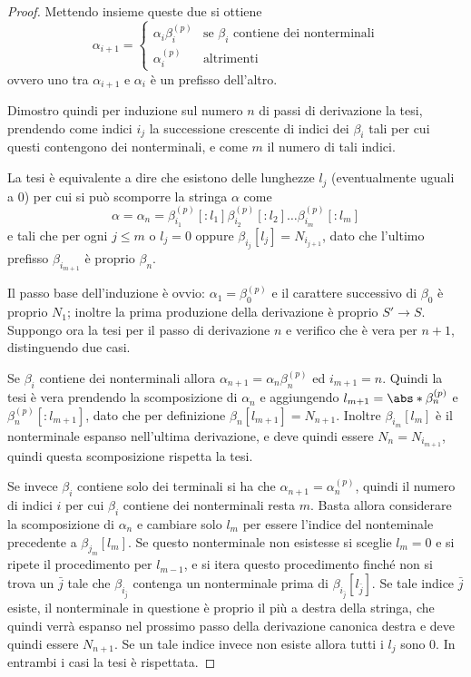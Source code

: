 \documentclass[12pt]{article}
\numberwithin{theorem}{subsection}
\begin{document}
\begin{proof}
	Mettendo insieme queste due si ottiene
	\[
	\alpha_{i+1} = \begin{cases*}
	\alpha_i \beta_i^{(p)} & \text{se $\beta_i$ contiene dei nonterminali} \\
	\alpha_i^{(p)} & \text{altrimenti}
	\end{cases*}
	\]
	ovvero uno tra $\alpha_{i+1}$ e $\alpha_i$ è un prefisso dell'altro.
	
	Dimostro quindi per induzione sul numero $n$ di passi di derivazione la tesi, prendendo come indici $i_j$ la successione crescente di indici dei $\beta_i$ tali per cui questi contengono dei nonterminali, e come $m$ il numero di tali indici.
	
	La tesi è equivalente a dire che esistono delle lunghezze $l_j$ (eventualmente uguali a 0) per cui si può scomporre la stringa $\alpha$ come
	\[
	\alpha = \alpha_n = \beta_{i_1}^{(p)}[:l_1] \beta_{i_2}^{(p)}[:l_2] \dots \beta_{i_m}^{(p)}[:l_m]
	\]
	e tali che per ogni $j \le m$ o $l_j = 0$ oppure $\beta_{i_j}[l_j] = N_{i_{j + 1}}$, dato che l'ultimo prefisso $\beta_{i_{m+1}}$ è proprio $\beta_n$.
	
	Il passo base dell'induzione è ovvio: $\alpha_1 = \beta_0^{(p)}$ e il carattere successivo di $\beta_0$ è proprio $N_1$; inoltre la prima produzione della derivazione è proprio $S' \rightarrow S$. Suppongo ora la tesi per il passo di derivazione $n$ e verifico che è vera per $n + 1$, distinguendo due casi.
	
	Se $\beta_i$ contiene dei nonterminali allora $\alpha_{n+1} = \alpha_n \beta_n^{(p)}$ ed $i_{m+1} = n$. Quindi la tesi è vera prendendo la scomposizione di $\alpha_n$ e aggiungendo $l_{m+1} = \abs*{\beta_n^{(p)}}$ e $\beta_n^{(p)}[:l_{m+1}]$, dato che per definizione $\beta_n[l_{m+1}] = N_{n+1}$. Inoltre $\beta_{i_m}[l_m]$ è il nonterminale espanso nell'ultima derivazione, e deve quindi essere $N_n = N_{i_{m+1}}$, quindi questa scomposizione rispetta la tesi.
	
	Se invece $\beta_i$ contiene solo dei terminali si ha che $\alpha_{n+1} = \alpha_n^{(p)}$, quindi il numero di indici $i$ per cui $\beta_i$ contiene dei nonterminali resta $m$. Basta allora considerare la scomposizione di $\alpha_n$ e cambiare solo $l_m$ per essere l'indice del nonteminale precedente a $\beta_{j_m}[l_m]$. Se questo nonterminale non esistesse si sceglie $l_m = 0$ e si ripete il procedimento per $l_{m-1}$, e si itera questo procedimento finché non si trova un $\bar{j}$ tale che $\beta_{i_{\bar{j}}}$ contenga un nonterminale prima di $\beta_{i_{\bar{j}}}[l_{\bar{j}}]$.
	Se tale indice $\bar{j}$ esiste, il nonterminale in questione è proprio il più a destra della stringa, che quindi verrà espanso nel prossimo passo della derivazione canonica destra e deve quindi essere $N_{n+1}$. Se un tale indice invece non esiste allora tutti i $l_j$ sono 0. In entrambi i casi la tesi è rispettata.
	

\end{proof}
\end{document}

